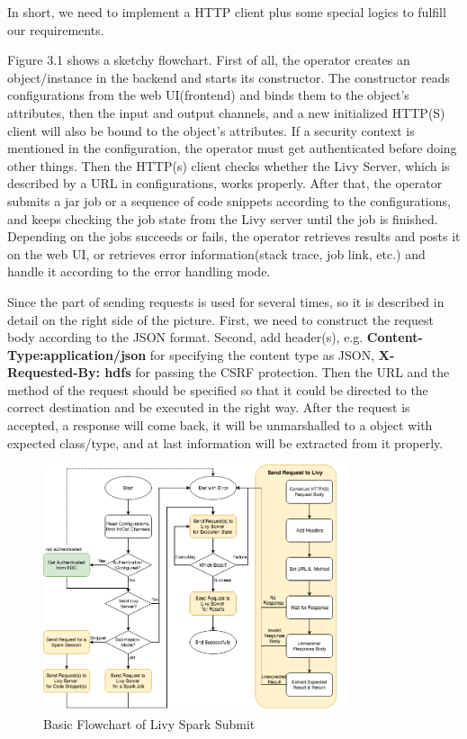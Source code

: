 \documentclass[article,colorback,accentcolor=tud4c]{tudreport}
\begin{document}
	In short, we need to implement a HTTP client plus some special logics to fulfill our requirements. 
	
	Figure 3.1 shows a sketchy flowchart. First of all, the operator creates an object/instance in the backend and starts its constructor. The constructor reads configurations from the web UI(frontend) and binds them to the object's attributes, then the input and output channels, and a new initialized HTTP(S) client will also be bound to the object's attributes. If a security context is mentioned in the configuration, the operator must get authenticated before doing other things. Then the HTTP(s) client checks whether the Livy Server, which is described by a URL in configurations, works properly. After that, the operator submits a jar job or a sequence of code snippets according to the configurations, and keeps checking the job state from the Livy server until the job is finished. Depending on the jobs succeeds or fails, the operator retrieves results and posts it on the web UI, or retrieves error information(stack trace, job link, etc.) and handle it according to the error handling mode.
	
	Since the part of sending requests is used for several times, so it is described in detail on the right side of the picture. First, we need to construct the request body according to the JSON format. Second, add header(s), e.g. \textbf{Content-Type:application/json} for specifying the content type as JSON, \textbf{X-Requested-By: hdfs} for passing the CSRF protection. Then the URL and the method of the request should be specified so that it could be directed to the correct destination and be executed in the right way. After the request is accepted, a response will come back, it will be unmarshalled to a object with expected class/type, and at last information will be extracted from it properly.
	
	\begin{figure}[!h]
		\centering
		\includegraphics[width=0.8\textwidth]{flowchart}
		\caption{Basic Flowchart of Livy Spark Submit}
	\end{figure}
	
\end{document}

